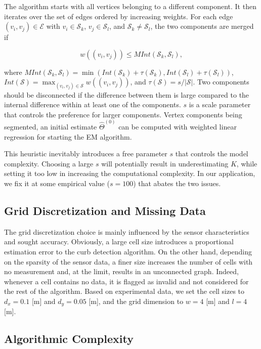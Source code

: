 The algorithm starts with all vertices belonging to a different component. It
then iterates over the set of edges ordered by increasing weights. For each
edge $(v_i,v_j)\in\mathcal{E}$ with $v_i\in\mathcal{S}_k$,
$v_j\in\mathcal{S}_l$, and $\mathcal{S}_k\neq\mathcal{S}_l$, the two components
are merged if

\begin{equation}
\label{eqn:merge}
w((v_i,v_j))\leq MInt(\mathcal{S}_k, \mathcal{S}_l),
\end{equation}

where $MInt(\mathcal{S}_k,\mathcal{S}_l)=\min(Int(\mathcal{S}_k)+
\tau(\mathcal{S}_k),Int(\mathcal{S}_l)+\tau(\mathcal{S}_l))$,
$Int(\mathcal{S})=\max_{(v_i,v_j)\in\mathcal{S}} w((v_i,v_j))$, and
$\tau(\mathcal{S})=s/|\mathcal{S}|$. Two components should be disconnected if
the difference between them is large compared to the internal difference within
at least one of the components. $s$ is a scale parameter that controls the
preference for larger components. Vertex components being segmented, an initial
estimate $\hat{\Theta}^{(0)}$ can be computed with weighted linear regression
for starting the EM algorithm.

This heuristic inevitably introduces a free parameter $s$ that controls the
model complexity. Choosing a large $s$ will potentially result in
underestimating $K$, while setting it too low in increasing the computational
complexity. In our application, we fix it at some empirical value ($s=100$) that
abates the two issues.

\subsection{Grid Discretization and Missing Data}

The grid discretization choice is mainly influenced by the sensor
characteristics and sought accuracy. Obviously, a large cell size introduces
a proportional estimation error to the curb detection algorithm. On the other
hand, depending on the sparsity of the sensor data, a finer size increases the
number of cells with no measurement and, at the limit, results in an unconnected
graph. Indeed, whenever a cell contains no data, it is flagged as invalid and
not considered for the rest of the algorithm. Based on experimental data, we
set the cell sizes to $d_x=0.1$ [m] and $d_y=0.05$ [m], and the grid dimension
to $w=4$ [m] and $l=4$ [m].

\subsection{Algorithmic Complexity}

